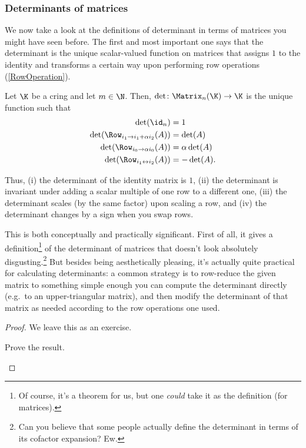 \subsubsection{Determinants of matrices}

We now take a look at the definitions of determinant in terms of matrices you might have seen before.  The first and most important one says that the determinant is the unique scalar-valued function on matrices that assigns $1$ to the identity and transforms a certain way upon performing row operations (\cref{RowOperation}).
\begin{thm}{}{}
	Let $\K$ be a cring and let $m\in \N$.  Then, $\det \colon \Matrix _n(\K )\rightarrow \K$ is the unique function such that
	\begin{align}
		\det (\id _n) & =1 \\
		\det (\Row _{i_1\rightarrow i_1+\alpha i_2}(A)) & =\det (A) \\
		\det (\Row _{i_0\rightarrow \alpha i_0}(A)) & =\alpha \det (A) \\
		\det (\Row _{i_1\leftrightarrow i_2}(A)) & =-\det (A).
	\end{align}
	\begin{rmk}
		Thus, (i) the determinant of the identity matrix is $1$, (ii) the determinant is invariant under adding a scalar multiple of one row to a different one, (iii) the determinant scales (by the same factor) upon scaling a row, and (iv) the determinant changes by a sign when you swap rows.
	\end{rmk}
	\begin{rmk}
		This is both conceptually and practically significant.  First of all, it gives a definition\footnote{Of course, it's a theorem for us, but one \emph{could} take it as the definition (for matrices).} of the determinant of matrices that doesn't look absolutely disgusting.\footnote{Can you believe that some people actually define the determinant in terms of its cofactor expansion?  Ew.}  But besides being aesthetically pleasing, it's actually quite practical for calculating determinants:  a common strategy is to row-reduce the given matrix to something simple enough you can compute the determinant directly (e.g.~to an upper-triangular matrix), and then modify the determinant of that matrix as needed according to the row operations one used.
	\end{rmk}
	\begin{proof}
		We leave this as an exercise.
		\begin{exr}[breakable=false]{}{}
			Prove the result.
		\end{exr}
	\end{proof}
\end{thm}
